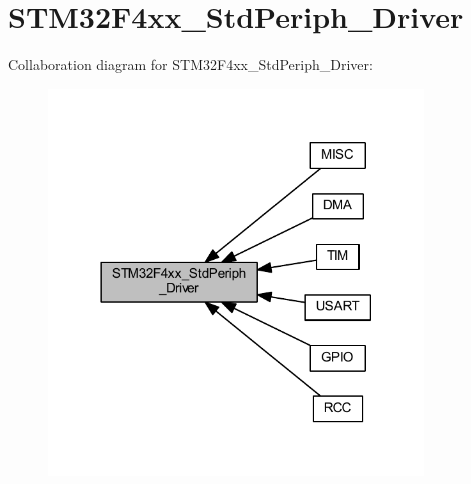 \hypertarget{group___s_t_m32_f4xx___std_periph___driver}{}\section{S\+T\+M32\+F4xx\+\_\+\+Std\+Periph\+\_\+\+Driver}
\label{group___s_t_m32_f4xx___std_periph___driver}
Collaboration diagram for S\+T\+M32\+F4xx\+\_\+\+Std\+Periph\+\_\+\+Driver\+:\nopagebreak
\begin{figure}[H]
\begin{center}
\leavevmode
\includegraphics[width=282pt]{group___s_t_m32_f4xx___std_periph___driver}
\end{center}
\end{figure}
